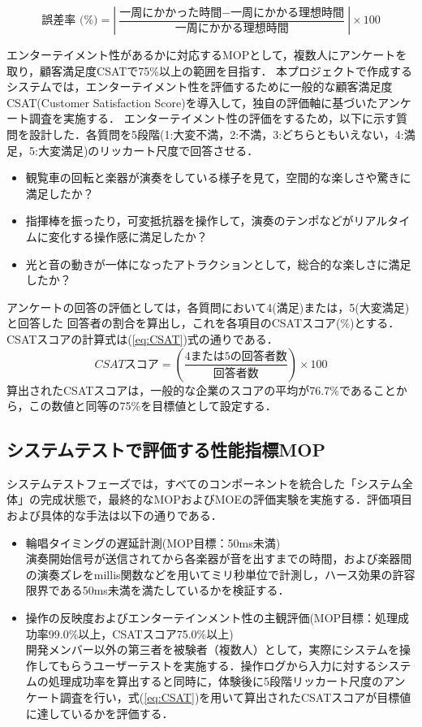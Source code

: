 \documentclass[lualatex,book,paper=a4paper,jafontsize=11.5pt,jafontscale=1.05]{jlreq}
\begin{document}
\begin{equation}
	\mbox{誤差率 (\%)} = \left| \frac{\mbox{一周にかかった時間} - \mbox{一周にかかる理想時間}}{\mbox{一周にかかる理想時間}} \right| \times 100
	\label{eq:riso}
\end{equation}

エンターテイメント性があるかに対応するMOPとして，複数人にアンケートを取り，顧客満足度CSATで75\%以上の範囲を目指す．
本プロジェクトで作成するシステムでは，エンターテイメント性を評価するために一般的な顧客満足度CSAT(Customer Satisfaction Score)を導入して，独自の評価軸に基づいたアンケート調査を実施する．
エンターテイメント性の評価をするため，以下に示す質問を設計した．各質問を5段階(1:大変不満，2:不満，3:どちらともいえない，4:満足，5:大変満足)のリッカート尺度で回答させる．
\begin{itemize}
	\item 観覧車の回転と楽器が演奏をしている様子を見て，空間的な楽しさや驚きに満足したか？
	\item 指揮棒を振ったり，可変抵抗器を操作して，演奏のテンポなどがリアルタイムに変化する操作感に満足したか？
	\item 光と音の動きが一体になったアトラクションとして，総合的な楽しさに満足したか？
\end{itemize}
アンケートの回答の評価としては，各質問において4(満足)または，5(大変満足)と回答した
回答者の割合を算出し，これを各項目のCSATスコア(\%)とする．CSATスコアの計算式は(\ref{eq:CSAT})式の通りである．
\begin{equation}
	CSATスコア = \left(\frac{4または5の回答者数}{回答者数}\right) \times 100 \label{eq:CSAT}
\end{equation}
算出されたCSATスコアは，一般的な企業のスコアの平均が76.7\%であることから，この数値と同等の75\%を目標値として設定する\cite{bib:ACSI}．




\subsection{システムテストで評価する性能指標MOP}
システムテストフェーズでは，すべてのコンポーネントを統合した「システム全体」の完成状態で，最終的なMOPおよびMOEの評価実験を実施する．評価項目および具体的な手法は以下の通りである．

\begin{itemize}
	\item 輪唱タイミングの遅延計測(MOP目標：50ms未満)
	\\ 演奏開始信号が送信されてから各楽器が音を出すまでの時間，および楽器間の演奏ズレをmillis関数などを用いてミリ秒単位で計測し，ハース効果の許容限界である50ms未満を満たしているかを検証する．
	
\item 操作の反映度およびエンターテインメント性の主観評価(MOP目標：処理成功率99.0\%以上，CSATスコア75.0\%以上)
	\\ 開発メンバー以外の第三者を被験者（複数人）として，実際にシステムを操作してもらうユーザーテストを実施する．操作ログから入力に対するシステムの処理成功率を算出すると同時に，体験後に5段階リッカート尺度のアンケート調査を行い，式(\ref{eq:CSAT})を用いて算出されたCSATスコアが目標値に達しているかを評価する．
\end{itemize}
\end{document}
